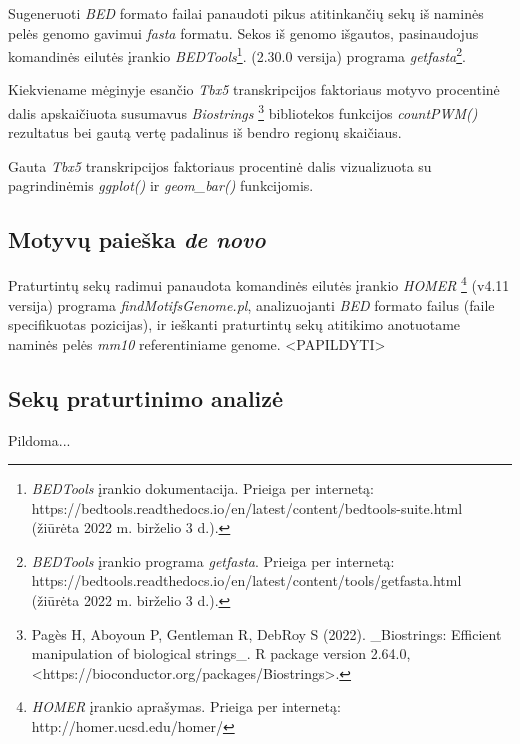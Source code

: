 \documentclass[12pt]{article}
\begin{document}
Sugeneruoti \emph{BED} formato failai panaudoti pikus atitinkančių
sekų iš naminės pelės genomo gavimui \emph{fasta} formatu.
Sekos iš genomo išgautos, pasinaudojus komandinės eilutės įrankio
\emph{BEDTools}\footnote{\emph{BEDTools} įrankio dokumentacija.
Prieiga per internetą:\\ 
https://bedtools.readthedocs.io/en/latest/content/bedtools-suite.html
(žiūrėta 2022 m. birželio 3 d.).}.
(2.30.0 versija) programa \emph{getfasta}\footnote{\emph{BEDTools}
įrankio programa \emph{getfasta}. Prieiga per internetą:\\
https://bedtools.readthedocs.io/en/latest/content/tools/getfasta.html
(žiūrėta 2022 m. birželio 3 d.).}.

Kiekviename mėginyje esančio \emph{Tbx5} transkripcijos faktoriaus
motyvo procentinė dalis apskaičiuota susumavus \emph{Biostrings}
\footnote{Pagès H, Aboyoun P, Gentleman R, DebRoy S (2022). \_Biostrings:
Efficient manipulation of biological strings\_. R package version
2.64.0, <https://bioconductor.org/packages/Biostrings>.}
bibliotekos funkcijos \emph{countPWM()} rezultatus bei gautą
vertę padalinus iš bendro regionų skaičiaus.

Gauta \emph{Tbx5} transkripcijos faktoriaus procentinė dalis
vizualizuota su pagrindinėmis \emph{ggplot()} ir \emph{geom\_bar()}
funkcijomis.

\subsection{Motyvų paieška \emph{de novo}}
Praturtintų sekų radimui panaudota komandinės eilutės įrankio
\emph{HOMER} \footnote{\emph{HOMER} įrankio aprašymas.
Prieiga per internetą:\\ http://homer.ucsd.edu/homer/}
(v4.11 versija) programa \emph{findMotifsGenome.pl},
analizuojanti \emph{BED} formato failus (faile specifikuotas
pozicijas), ir ieškanti praturtintų sekų atitikimo anotuotame
naminės pelės \emph{mm10} referentiniame genome.
<PAPILDYTI>

\subsection{Sekų praturtinimo analizė}
Pildoma...

\newpage


\end{document}
